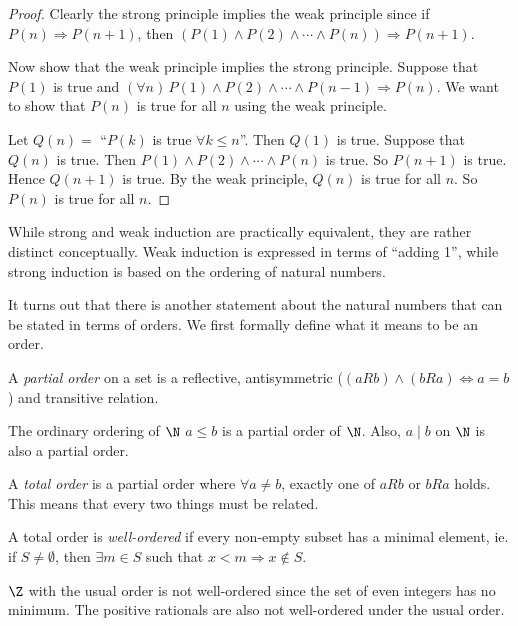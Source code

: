 \documentclass[a4paper]{article}
\begin{document}
\begin{proof}
  Clearly the strong principle implies the weak principle since if $P(n)\Rightarrow P(n + 1)$, then $(P(1)\wedge P(2)\wedge \cdots \wedge P(n))\Rightarrow P(n + 1)$.

  Now show that the weak principle implies the strong principle. Suppose that $P(1)$ is true and $(\forall n)\,P(1)\wedge P(2)\wedge \cdots \wedge P(n - 1)\Rightarrow P(n)$. We want to show that $P(n)$ is true for all $n$ using the weak principle.

  Let $Q(n) = $ ``$P(k)$ is true $\forall k\leq n$''. Then $Q(1)$ is true. Suppose that $Q(n)$ is true. Then $P(1)\wedge P(2)\wedge\cdots \wedge P(n)$ is true. So $P(n+1)$ is true. Hence $Q(n + 1)$ is true. By the weak principle, $Q(n)$ is true for all $n$. So $P(n)$ is true for all $n$.
\end{proof}
While strong and weak induction are practically equivalent, they are rather distinct conceptually. Weak induction is expressed in terms of ``adding 1'', while strong induction is based on the ordering of natural numbers.

It turns out that there is another statement about the natural numbers that can be stated in terms of orders. We first formally define what it means to be an order.

\begin{defi}
  A \emph{partial order} on a set is a reflective, antisymmetric ($(aRb) \wedge (bRa) \Leftrightarrow a = b$) and transitive relation.
\end{defi}

\begin{eg}
  The ordinary ordering of $\N$ $a\leq b$ is a partial order of $\N$. Also, $a\mid b$ on $\N$ is also a partial order.
\end{eg}

\begin{defi}
  A \emph{total order} is a partial order where $\forall a\not= b$, exactly one of $aRb$ or $bRa$ holds. This means that every two things must be related.
\end{defi}

\begin{defi}
  A total order is \emph{well-ordered} if every non-empty subset has a minimal element, ie. if $S\not= \emptyset$, then $\exists m\in S$ such that $x < m \Rightarrow x\not\in S$.
\end{defi}

\begin{eg}
  $\Z$ with the usual order is not well-ordered since the set of even integers has no minimum. The positive rationals are also not well-ordered under the usual order.
\end{eg}
\end{document}
